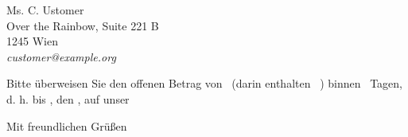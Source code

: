 \documentclass[fontsize=11pt,parskip=half]{scrlttr2}
\begin{document}
\begin{letter}{%
						Ms. C. Ustomer\\
						Over the Rainbow, Suite 221\kern 1pt B\\
						1245 Wien\\[1ex]
						\hfill\emph{customer@example.org}
	}


		Bitte überweisen Sie den offenen Betrag von 
		\Total\ (darin enthalten \TaxAmnt ~\TaxAbrv) 
		binnen \numberstringnum{\payperiod}~Tagen, d.\kern 1pt h. bis \DayName{\year}{\month}{\day+\payperiod}, den \duedate , auf unser 

		\AdvanceDate[-\payperiod]				%


\def\amount				{12}				%

\renewcommand*{\raggedsignature}{\raggedright}

		\closing{Mit freundlichen Grüßen}

	\end{letter}
\end{document}
